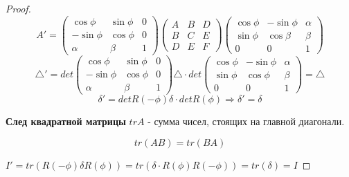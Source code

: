 \begin{proof}
\[\]
\[
  A' = \begin{pmatrix}\cos\phi & \sin\phi & 0 \\ -\sin\phi & \cos\phi & 0 \\ \alpha & \beta & 1\end{pmatrix} \begin{pmatrix} A & B & D \\ B & C & E \\ D & E & F \end{pmatrix} \begin{pmatrix}\cos\phi & -\sin\phi & \alpha \\ \sin\phi & \cos\beta & \beta \\ 0 & 0 & 1 \end{pmatrix}
\]
\[
  \triangle' = det\begin{pmatrix}\cos\phi & \sin\phi & 0 \\
    -\sin\phi & \cos\phi & 0 \\ \alpha & \beta & 1\end{pmatrix} \triangle \cdot det\begin{pmatrix}\cos\phi & -\sin\phi & \alpha \\ \sin\phi & \cos\phi & \beta \\ 0 & 0 & 1 \end{pmatrix} = \triangle
\]
\[
  \delta' = det R(-\phi) \delta \cdot det R(\phi) \Rightarrow \delta' = \delta
\]
\begin{definition}
\textbf{След квадратной матрицы} $tr A$ - сумма чисел, стоящих на главной диагонали.
\end{definition}
\begin{note}
 \[
 tr (AB) = tr(BA)
 \]
\end{note}
$I' = tr(R(-\phi) \delta R(\phi)) = tr(\delta \cdot R(\phi) R(-\phi)) = tr(\delta) = I$
\end{proof}

